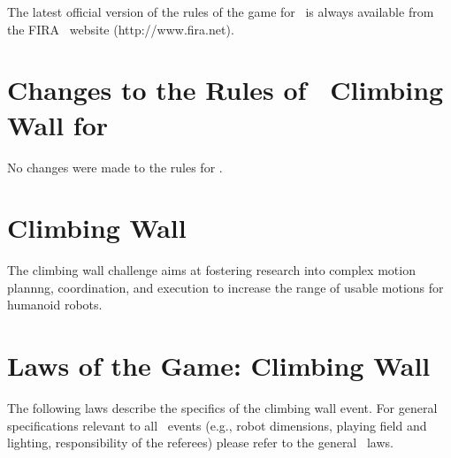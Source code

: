 \documentclass[12pt]{hurocup}
\begin{document}
The latest official version of the rules of the game for \HuroCup\ is
always available from the FIRA \HuroCup\ website (http://www.fira.net).

\section*{Changes to the Rules of \HuroCup\ Climbing Wall for \thisyear}

No changes were made to the rules for \thisyear.

\newpage

\section{Climbing Wall}
\label{sec:climbing-wall}

The climbing wall challenge aims at fostering research into complex
motion plannng, coordination, and execution to increase the range of
usable motions for humanoid robots.

\section{Laws of the Game: Climbing Wall}
\label{sec:laws-climbing-wall}

The following laws describe the specifics of the climbing wall
event. For general specifications relevant to all \HuroCup\ events
(e.g., robot dimensions, playing field and lighting, responsibility of
the referees) please refer to the general \HuroCup\ laws.

\label{law:field-of-play}
\end{document}
